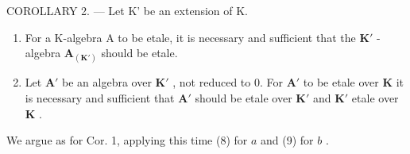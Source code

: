 COROLLARY 2. --- Let K' be an extension of K.

\begin{enumerate}
\def\labelenumi{\alph{enumi})}
\item
  For a K-algebra A to be etale, it is necessary and sufficient that the \(\mathbf{K}'\) -algebra \(\mathbf{A}_{(\mathbf{K}')}\) should be etale.
\item
  Let \(\mathbf{A}'\) be an algebra over \(\mathbf{K}'\) , not reduced to 0. For \(\mathbf{A}'\) to be etale over \(\mathbf{K}\) it is necessary and sufficient that \(\mathbf{A}'\) should be etale over \(\mathbf{K}'\) and \(\mathbf{K}'\) etale over \(\mathbf{K}\) .
\end{enumerate}

We argue as for Cor. 1, applying this time (8) for \(a\) and (9) for \(b\) .

